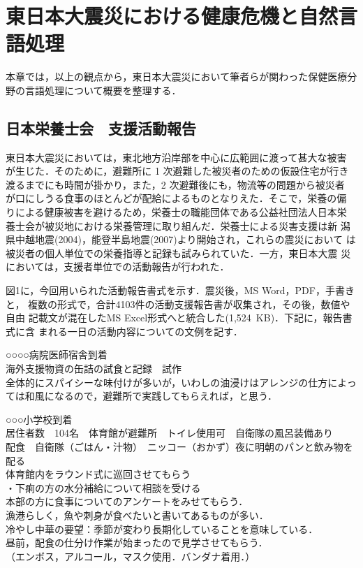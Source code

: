 \documentclass[japanese]{jnlp_1.4}
\begin{document}
\section{東日本大震災における健康危機と自然言語処理}

本章では，以上の観点から，東日本大震災において筆者らが関わった保健医療分野の言語処理について概要を整理する．


\subsection{日本栄養士会　支援活動報告}

東日本大震災においては，東北地方沿岸部を中心に広範囲に渡って甚大な被害
が生じた．そのために，避難所に 1 次避難した被災者のための仮設住宅が行き
渡るまでにも時間が掛かり，また，2 次避難後にも，物流等の問題から被災者
が口にしうる食事のほとんどが配給によるものとなりえた．そこで，栄養の偏
りによる健康被害を避けるため，栄養士の職能団体である公益社団法人日本栄
養士会が被災地における栄養管理に取り組んだ．栄養士による災害支援は新
潟県中越地震(2004)，能登半島地震(2007)より開始され，これらの震災において
は被災者の個人単位での栄養指導と記録も試みられていた．一方，東日本大震
災においては，支援者単位での活動報告が行われた．

図1に，今回用いられた活動報告書式を示す．震災後，MS Word，PDF，手書きと，
複数の形式で，合計4103件の活動支援報告書が収集され，その後，数値や自由
記載文が混在したMS Excel形式へと統合した(1,524~KB)．下記に，報告書式に含
まれる一日の活動内容についての文例を記す．

\vspace{1\Cvs}
\begin{screen}
○○○○病院医師宿舎到着\\
海外支援物資の缶詰の試食と記録　試作\\
全体的にスパイシーな味付けが多いが，いわしの油浸けはアレンジの仕方によっては和風になるので，避難所で実践してもらえれば，と思う．
\end{screen}

\vspace{1\Cvs}
\begin{screen}
○○○小学校到着\\
居住者数　104名　体育館が避難所　トイレ使用可　自衛隊の風呂装備あり\\
配食　自衛隊（ごはん・汁物）　ニッコー（おかず）夜に明朝のパンと飲み物を配る\\
体育館内をラウンド式に巡回させてもらう\\
・下痢の方の水分補給について相談を受ける\\
本部の方に食事についてのアンケートをみせてもらう．\\
漁港らしく，魚や刺身が食べたいと書いてあるものが多い．\\
冷やし中華の要望：季節が変わり長期化していることを意味している．\\
昼前，配食の仕分け作業が始まったので見学させてもらう．\\
（エンボス，アルコール，マスク使用．バンダナ着用．）
\end{screen}
\end{document}
